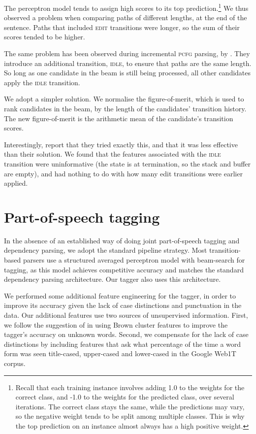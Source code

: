 \documentclass[11pt,letterpaper]{article}
\begin{document}
The perceptron model tends to assign
high scores to its top prediction.\footnote{Recall that each training instance
involves adding 1.0 to the weights for the correct class, and -1.0 to the weights
for the predicted class, over several iterations. The correct class stays the
same, while the predictions may vary, so the negative weight tends to be split
among multiple classes. This is why the top prediction on an instance almost
always has a high positive weight.}
We thus observed a problem when comparing paths of different lengths, at the end
of the sentence. Paths that included \textsc{edit} transitions were longer,
so the sum of their scores tended to be higher.

The same problem has been observed during incremental \textsc{pcfg} parsing,
by \citet{zhang:13}.  They introduce an additional transition, \textsc{idle},
to ensure that paths are the same length. So long as one candidate in the beam
is still being processed, all other candidates apply the \textsc{idle} transition.

We adopt a simpler solution.  We normalise the figure-of-merit, which is used to rank
candidates in the beam, by the length of the candidates' transition history. The
new figure-of-merit is the
arithmetic mean of the candidate's transition scores.

Interestingly, \citet{zhang:13} report that they tried exactly this, and that it
was less effective than their solution. We found that the features
associated with the \textsc{idle} transition were uninformative (the state is at
termination, so the stack and buffer are empty), and had nothing to do with how
many edit transitions were earlier applied.

\section{Part-of-speech tagging}

In the absence of an established way of doing joint part-of-speech tagging and
dependency parsing, we adopt the standard pipeline strategy.  Most transition-based
parsers use a structured averaged perceptron model with beam-search for tagging,
as this model achieves competitive accuracy and matches the standard dependency
parsing architecture. Our tagger also uses this architecture.

We performed some additional feature engineering for the tagger, in order to
improve its accuracy given the lack of case distinctions and punctuation in
the data. Our additional features use two sources of unsupervised information.
First, we follow the suggestion of \citet{manning:11} in using Brown cluster
features to improve the tagger's accuracy on unknown words. Second, we compensate
for the lack of case distinctions by including features that ask what percentage
of the time a word form was seen title-cased, upper-cased and lower-cased in the
Google Web1T corpus. 
\end{document}
